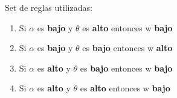 Set de reglas utilizadas:
\begin{enumerate}
    \item Si $\alpha$ es \textbf{bajo} y $\theta$ es \textbf{alto} entonces w \textbf{bajo}
    \item Si $\alpha$ es \textbf{bajo} y $\theta$ es \textbf{bajo} entonces w \textbf{alto}
    \item Si $\alpha$ es \textbf{alto} y $\theta$ es \textbf{bajo} entonces w \textbf{bajo}
    \item Si $\alpha$ es \textbf{alto} y $\theta$ es \textbf{alto} entonces w \textbf{bajo}
\end{enumerate}


